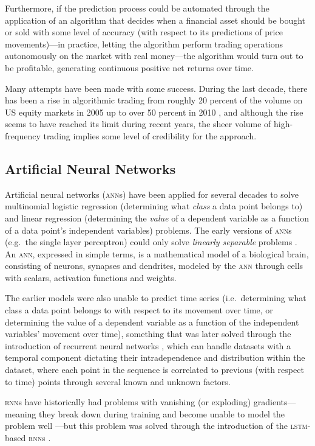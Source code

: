 \begin{multicols}{2}
Furthermore, if the prediction process could be automated through the
application of an algorithm that decides when a financial asset should be bought
or sold with some level of accuracy (with respect to its predictions of price
movements)---in practice, letting the algorithm perform trading operations
autonomously on the market with real money---the algorithm would turn out to be
profitable, generating continuous positive net returns over time.

Many attempts have been made with some success. During the last decade, there
has been a rise in algorithmic trading from roughly 20 percent of the volume on
US equity markets in 2005 up to over 50 percent in 2010 \citep{kaya2016}, and
although the rise seems to have reached its limit during recent years, the sheer
volume of high-frequency trading implies some level of credibility for the
approach.

\subsection{Artificial Neural Networks}

Artificial neural networks (\textsc{ann}s) have been applied for several decades
to solve multinomial logistic regression (determining what \textit{class} a data
point belongs to) and linear regression (determining the \textit{value} of a
dependent variable as a function of a data point's independent variables)
problems.  The early versions of \textsc{ann}s (e.g.\ the single layer
perceptron) could only solve \textit{linearly separable} problems
\citep{rosenblatt1958}.  An \textsc{ann}, expressed in simple terms, is a
mathematical model of a biological brain, consisting of neurons, synapses and
dendrites, modeled by the \textsc{ann} through cells with scalars, activation
functions and weights.

The earlier models were also unable to predict time series (i.e.\ determining
what class a data point belongs to with respect to its movement over time, or
determining the value of a dependent variable as a function of the independent
variables' movement over time), something that was later solved through the
introduction of recurrent neural networks \citep{rumelhart1986}, which can
handle datasets with a temporal component dictating their intradependence and
distribution within the dataset, where each point in the sequence is correlated
to previous (with respect to time) points through several known and unknown
factors.

\textsc{rnn}s have historically had problems with vanishing (or exploding)
gradients---meaning they break down during training and become unable to model
the problem well \citep{pascanu2012}---but this problem was solved through the
introduction of the \textsc{lstm}-based \textsc{rnn}s \citep{hochreiter1997}.


\end{multicols}
